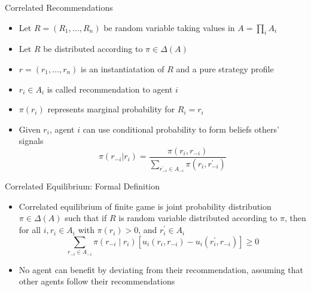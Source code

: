 \documentclass[11pt,aspectratio=169,handout]{beamer}
\begin{document}
  \begin{frame}{Correlated Recommendations}
   \begin{itemize}[<+->]
    \setlength{\itemsep}{0.56em}
    \item Let $R=(R_1,\dots,R_n)$ be random variable taking values in $A=\prod_i A_i$
    \item Let $R$ be distributed according to $\pi \in \Delta(A)$
    \item $r = (r_1, \dots, r_n)$ is an instantiatation of $R$ and a pure strategy profile
    \item $r_i \in A_i$ is called \alert{recommendation to agent $i$}
    \item $\pi(r_i)$ represents marginal probability for $R_i = r_i$
    \item Given $r_i$, agent $i$ can use conditional probability to form beliefs others' signals
    $$\pi(r_{-i} | r_i) = \frac{\pi(r_i, r_{-i})}{\sum_{r^{\prime}_{-i}\in A_{-i}}\pi(r_i,r^{\prime}_{-i})}$$
   \end{itemize}
  \end{frame}

  \begin{frame}{Correlated Equilibrium: Formal Definition}
   \begin{itemize}[<+->]
    \item \alert{Correlated equilibrium} of finite game is joint probability distribution $\pi \in \Delta(A)$ such that if $R$ is random variable distributed according to $\pi$, then for all $i, r_i \in A_i$ with $\pi(r_i) > 0$, and $r^{\prime}_i \in A_i$
    $$
     \sum_{r_{-i} \in A_{-i}} \pi(r_{-i} \mid r_i) \left[u_i(r_i, r_{-i}) - u_i(r^{\prime}_i, r_{-i})\right]  \ge 0
    $$
    \item No agent can benefit by deviating from their recommendation, assuming that other agents follow their recommendations
   \end{itemize}
  \end{frame}
\end{document}
